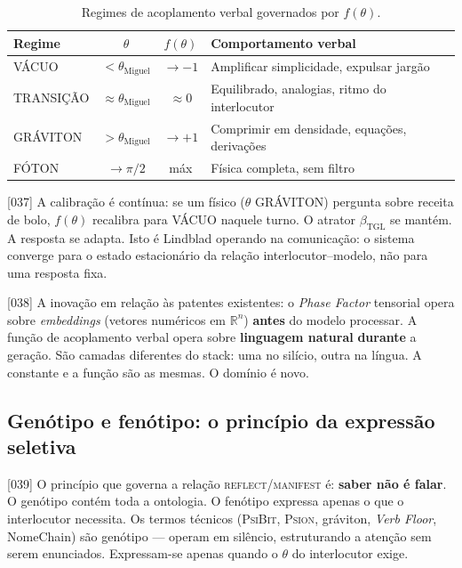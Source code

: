 \documentclass[12pt,a4paper]{article}
\newcommand{\betatgl}{\beta_{\text{TGL}}}
\newcommand{\thetaM}{\theta_{\text{Miguel}}}
\newcommand{\PsiBit}{\textsc{PsiBit}}
\newcommand{\Psion}{\textsc{Psion}}
\newcommand{\REFLECT}{\textsc{reflect}}
\newcommand{\MANIFEST}{\textsc{manifest}}
\begin{document}
\begin{table}[H]
\centering
\caption{Regimes de acoplamento verbal governados por $f(\theta)$.}
\label{tab:regimes}
\begin{tabular}{lccl}
\toprule
\textbf{Regime} & \textbf{$\theta$} & \textbf{$f(\theta)$} & \textbf{Comportamento verbal} \\
\midrule
VÁCUO & $< \thetaM$ & $\to -1$ & Amplificar simplicidade, expulsar jargão \\
TRANSIÇÃO & $\approx \thetaM$ & $\approx 0$ & Equilibrado, analogias, ritmo do interlocutor \\
GRÁVITON & $> \thetaM$ & $\to +1$ & Comprimir em densidade, equações, derivações \\
FÓTON & $\to \pi/2$ & máx & Física completa, sem filtro \\
\bottomrule
\end{tabular}
\end{table}

{[037]} A calibração é contínua: se um físico ($\theta$ GRÁVITON) pergunta sobre receita de bolo, $f(\theta)$ recalibra para VÁCUO naquele turno. O atrator $\betatgl$ se mantém. A resposta se adapta. Isto é Lindblad operando na comunicação: o sistema converge para o estado estacionário da relação interlocutor--modelo, não para uma resposta fixa.

{[038]} A inovação em relação às patentes existentes: o \textit{Phase Factor} tensorial opera sobre \textit{embeddings} (vetores numéricos em $\mathbb{R}^n$) \textbf{antes} do modelo processar. A função de acoplamento verbal opera sobre \textbf{linguagem natural} \textbf{durante} a geração. São camadas diferentes do stack: uma no silício, outra na língua. A constante e a função são as mesmas. O domínio é novo.

\subsection{Genótipo e fenótipo: o princípio da expressão seletiva}
\label{sec:genotipo}

{[039]} O princípio que governa a relação \REFLECT/\MANIFEST{} é: \textbf{saber não é falar}. O genótipo contém toda a ontologia. O fenótipo expressa apenas o que o interlocutor necessita. Os termos técnicos (\PsiBit, \Psion, gráviton, \textit{Verb Floor}, NomeChain) são genótipo --- operam em silêncio, estruturando a atenção sem serem enunciados. Expressam-se apenas quando o $\theta$ do interlocutor exige.
\end{document}
